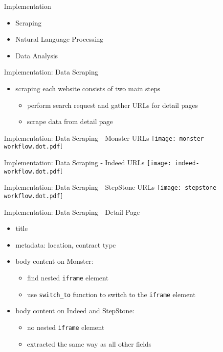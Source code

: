 \documentclass[aspectratio=169]{beamer}
\begin{document}
  \begin{frame}{Implementation}
    \begin{itemize}
      \item Scraping
      \item Natural Language Processing
      \item Data Analysis
    \end{itemize}
  \end{frame}

  \begin{frame}{Implementation: Data Scraping}
    \begin{itemize}
      \item scraping each website consists of two main steps
        \begin{itemize}
          \item perform search request and gather URLs for detail pages
          \item scrape data from detail page
        \end{itemize}
    \end{itemize}
  \end{frame}

  \begin{frame}{Implementation: Data Scraping - Monster URLs}
    \centering
    \texttt{[image: monster-workflow.dot.pdf]}
  \end{frame}

  \begin{frame}{Implementation: Data Scraping - Indeed URLs}
    \centering
    \texttt{[image: indeed-workflow.dot.pdf]}
  \end{frame}

  \begin{frame}{Implementation: Data Scraping - StepStone URLs}
    \centering
    \texttt{[image: stepstone-workflow.dot.pdf]}
  \end{frame}

  \begin{frame}{Implementation: Data Scraping - Detail Page}
    \begin{itemize}
      \item title
      \item metadata: location, contract type
      \item body content on Monster:
        \begin{itemize}
          \item find nested \texttt{iframe} element
          \item use \texttt{switch\_to} function to switch to the \texttt{iframe} element
        \end{itemize}
      \item body content on Indeed and StepStone:
        \begin{itemize}
          \item no nested \texttt{iframe} element
          \item extracted the same way as all other fields
        \end{itemize}
    \end{itemize}
  \end{frame}
\end{document}
